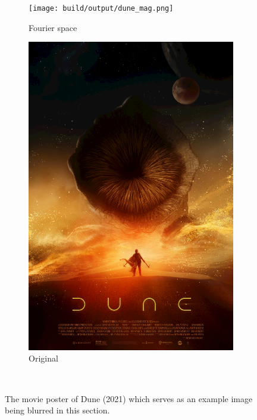 \begin{figure}[htbp]
    \centering
    \begin{subfigure}[h]{.49\linewidth}
        \centering
        \texttt{[image: build/output/dune\_mag.png]}
        \caption{Fourier space}
    \end{subfigure}
    \begin{subfigure}[h]{.49\linewidth}
        \centering
        \includegraphics[width=.9\linewidth]{images/dune.png}
        \caption{Original}
    \end{subfigure}\
    \caption{The movie poster of Dune (2021) which serves as an example image being blurred in this section.}
    \label{fig:dune_orig}
\end{figure}

